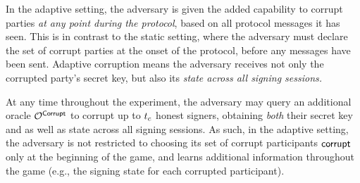 In the adaptive setting, the adversary is given the added capability to corrupt parties \emph{at any point during the protocol}, based on all protocol messages it has seen.
This is in contrast to the static setting, where the adversary must declare the set of corrupt parties at the onset of the protocol, before any messages have been sent.
Adaptive corruption means the adversary receives not only the corrupted party's secret key,
but also its \emph{state across all signing sessions.}

At any time throughout the experiment, the adversary may query an additional oracle $\mathcal{O}^{\mathsf{Corrupt}}$ to corrupt
up to $t_c$ honest signers,
obtaining \emph{both} their secret key and as well as state across all signing sessions.
As such,
in the adaptive setting,
the adversary is not restricted to choosing its set of
corrupt participants $\mathsf{corrupt}$ only at the beginning of the game,
and learns additional information throughout the game (e.g., the signing state for each corrupted participant).




